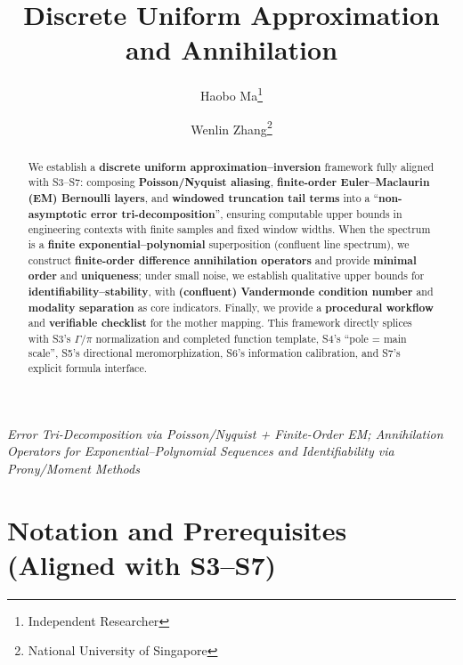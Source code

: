 \documentclass[11pt,a4paper]{article}
\title{Discrete Uniform Approximation and Annihilation}
\author{Haobo Ma\thanks{Independent Researcher} \and Wenlin Zhang\thanks{National University of Singapore}}
\date{}
\theoremstyle{remark}
\begin{document}
\maketitle

\begin{center}
\textit{Error Tri-Decomposition via Poisson/Nyquist + Finite-Order EM; Annihilation Operators for Exponential--Polynomial Sequences and Identifiability via Prony/Moment Methods}
\end{center}

\begin{abstract}
We establish a \textbf{discrete uniform approximation--inversion} framework fully aligned with S3--S7: composing \textbf{Poisson/Nyquist aliasing}, \textbf{finite-order Euler--Maclaurin (EM) Bernoulli layers}, and \textbf{windowed truncation tail terms} into a ``\textbf{non-asymptotic error tri-decomposition}'', ensuring computable upper bounds in engineering contexts with finite samples and fixed window widths. When the spectrum is a \textbf{finite exponential--polynomial} superposition (confluent line spectrum), we construct \textbf{finite-order difference annihilation operators} and provide \textbf{minimal order} and \textbf{uniqueness}; under small noise, we establish qualitative upper bounds for \textbf{identifiability--stability}, with \textbf{(confluent) Vandermonde condition number} and \textbf{modality separation} as core indicators. Finally, we provide a \textbf{procedural workflow} and \textbf{verifiable checklist} for the mother mapping. This framework directly splices with S3's $\Gamma/\pi$ normalization and completed function template, S4's ``pole = main scale'', S5's directional meromorphization, S6's information calibration, and S7's explicit formula interface.
\end{abstract}

\section{Notation and Prerequisites (Aligned with S3--S7)}
\end{document}
